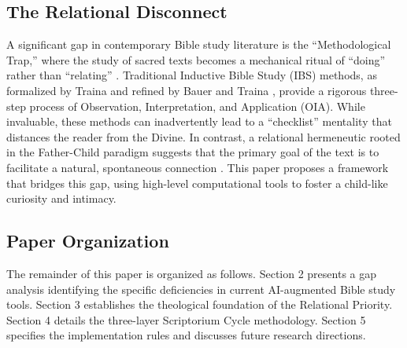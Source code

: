 \subsection{The Relational Disconnect}
A significant gap in contemporary Bible study literature is the ``Methodological Trap,'' where the study of sacred texts becomes a mechanical ritual of ``doing'' rather than ``relating'' \cite{packer1973}. Traditional Inductive Bible Study (IBS) methods, as formalized by Traina \cite{traina1952} and refined by Bauer and Traina \cite{bauer2011}, provide a rigorous three-step process of Observation, Interpretation, and Application (OIA). While invaluable, these methods can inadvertently lead to a ``checklist'' mentality that distances the reader from the Divine. In contrast, a relational hermeneutic rooted in the Father-Child paradigm suggests that the primary goal of the text is to facilitate a natural, spontaneous connection \cite{nih2024}. This paper proposes a framework that bridges this gap, using high-level computational tools to foster a child-like curiosity and intimacy.

\subsection{Paper Organization}
The remainder of this paper is organized as follows. Section 2 presents a gap analysis identifying the specific deficiencies in current AI-augmented Bible study tools. Section 3 establishes the theological foundation of the Relational Priority. Section 4 details the three-layer Scriptorium Cycle methodology. Section 5 specifies the implementation rules and discusses future research directions.
